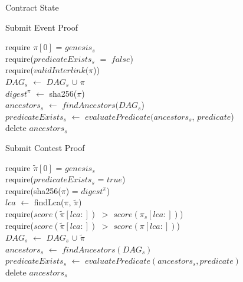 \begin{algorithm}
    \caption{Contract State}
    \label{algo:hash_and_resubmit_data}
\end{algorithm}

\begin{algorithm}
    \caption{Submit Event Proof}
    \label{algo:hash_and_resubmit_submit}
    require $\pi[0]$ = $genesis_{s}$ \\
    require($predicateExists_{s}$ $=$ $false$) \\
    require($validInterlink(\pi$))\\
    $DAG_{s}$ $\leftarrow$ $DAG_{s}$ $\cup$ $\pi$\\
    $digest^{\pi}$ $\leftarrow$ sha256($\pi$) \\
    $ancestors_{s}$ $\leftarrow$ $findAncestors(DAG_{s}$)\\
    $predicateExists_{s}$ $\leftarrow$ $evaluatePredicate(ancestors_{s}$,
    $predicate$)\\
    delete $ancestors_{s}$\\
\end{algorithm}

\vspace{0.1cm}

\begin{algorithm}
    \caption{Submit Contest Proof}
    \label{algo:hash_and_resubmit_contest}
    require $\tilde\pi[0]$ = $genesis_{s}$ \\
    require($predicateExists_{s}$ = $true$) \\
    require(sha256($\pi$) = $digest^{\pi}$) \\
    $lca$ $\leftarrow$ findLca($\pi$, $\tilde\pi$) \\
    require($score(\tilde\pi[lca:])$ $>$ $score(\pi_{s}[lca:])$) \\
    require($score(\tilde\pi[lca:])$ $>$ $score(\pi[lca:])$) \\
    $DAG_{s}$ $\leftarrow$ $DAG_{s}$ $\cup$ $\tilde\pi$\\
    $ancestors_{s}$ $\leftarrow$ $findAncestors(DAG_{s})$\\
    $predicateExists_{s}$ $\leftarrow$ $evaluatePredicate(ancestors_{s}, predicate)$\\
    delete $ancestors_{s}$\\
\end{algorithm}
